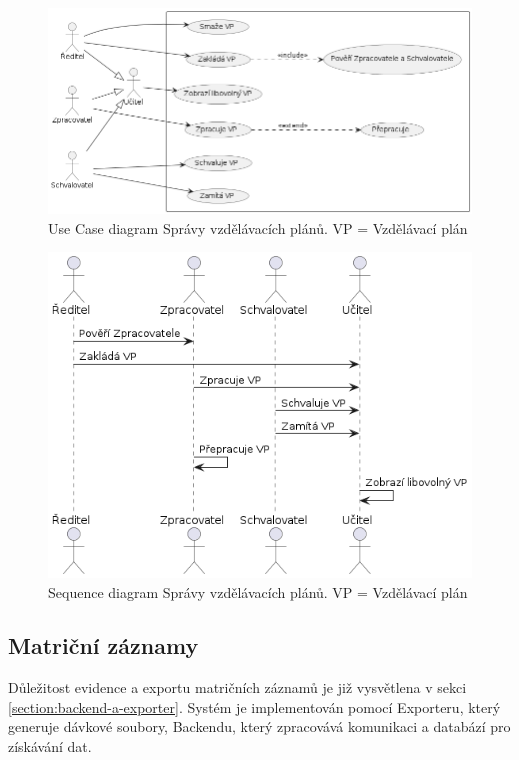 \documentclass[FM,Proj]{tulthesis}
\begin{document}
\begin{figure}[H]
    \includegraphics[width=\textwidth-28pt]{uc-sprava-vzdelavacich-planu.png}
    \caption{Use Case diagram Správy vzdělávacích plánů. VP = Vzdělávací plán}
    \label{fig:uc-sprava-vzdelavacich-planu}
\end{figure}

\begin{figure}[H]
    \includegraphics[width=\textwidth-28pt]{seq-sprava-vzdelavacich-planu.png}
    \caption{Sequence diagram Správy vzdělávacích plánů. VP = Vzdělávací plán}
    \label{fig:seq-sprava-vzdelavacich-planu}
\end{figure} 

\subsection*{Matriční záznamy}
Důležitost evidence a exportu matričních záznamů je již vysvětlena v sekci 
\ref{section:backend-a-exporter}. Systém je implementován pomocí Exporteru, 
který generuje dávkové soubory, Backendu, který zpracovává komunikaci a databází
pro získávání dat.
\end{document}

